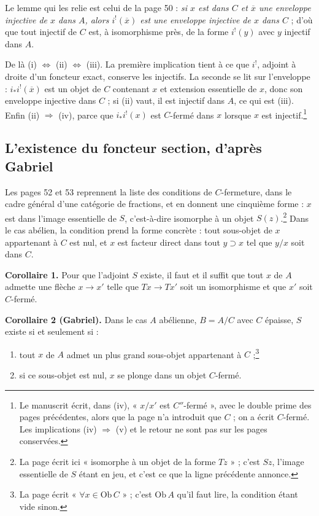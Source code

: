 \documentclass[11pt,a4paper]{article}
\begin{document}
Le lemme qui les relie est celui de la page 50 : \emph{si $x$ est dans $C$ et
$\overline{x}$ une enveloppe injective de $x$ dans $A$, alors
$i^{!}(\overline{x})$ est une enveloppe injective de $x$ dans $C$} ; d'où
que tout injectif de $C$ est, à isomorphisme près, de la forme $i^{!}(y)$ avec
$y$ injectif dans $A$.

De là (i) $\Leftrightarrow$ (ii) $\Leftrightarrow$ (iii). La première
implication tient à ce que $i^{!}$, adjoint à droite d'un foncteur exact,
conserve les injectifs. La seconde se lit sur l'enveloppe : $i_{*}i^{!}
(\overline{x})$ est un objet de $C$ contenant $x$ et extension essentielle de
$x$, donc son enveloppe injective dans $C$ ; si (ii) vaut, il est injectif dans
$A$, ce qui est (iii). Enfin (ii) $\Rightarrow$ (iv), parce que
$i_{*}i^{!}(x)$ est $C$-fermé dans $x$ lorsque $x$ est
injectif.\footnote{Le manuscrit écrit, dans (iv), « $x/x'$ est $C''$-fermé »,
avec le double prime des pages précédentes, alors que la page n'a introduit que
$C$ ; on a écrit $C$-fermé. Les implications (iv) $\Rightarrow$ (v) et le
retour ne sont pas sur les pages conservées.}

\subsection*{L'existence du foncteur section, d'après Gabriel}

Les pages 52 et 53 reprennent la liste des conditions de $C$-fermeture, dans le
cadre général d'une catégorie de fractions, et en donnent une cinquième forme :
$x$ est dans l'image essentielle de $S$, c'est-à-dire isomorphe à un objet
$S(z)$.\footnote{La page écrit ici « isomorphe à un objet de la forme $Tz$ » ;
c'est $Sz$, l'image essentielle de $S$ étant en jeu, et c'est ce que la ligne
précédente annonce.} Dans le cas abélien, la condition prend la forme
concrète : tout sous-objet de $x$ appartenant à $C$ est nul, et $x$ est facteur
direct dans tout $y \supset x$ tel que $y/x$ soit dans $C$.

\textbf{Corollaire 1.} Pour que l'adjoint $S$ existe, il faut et il suffit que
tout $x$ de $A$ admette une flèche $x \to x'$ telle que $Tx \to Tx'$ soit un
isomorphisme et que $x'$ soit $C$-fermé.

\textbf{Corollaire 2 (Gabriel).} Dans le cas $A$ abélienne, $B = A/C$ avec $C$
épaisse, $S$ existe si et seulement si :

\begin{enumerate}
\item[a)] tout $x$ de $A$ admet un plus grand sous-objet appartenant à
$C$ ;\footnote{La page écrit « $\forall x \in \mathrm{Ob}\,C$ » ; c'est
$\mathrm{Ob}\,A$ qu'il faut lire, la condition étant vide sinon.}
\item[b)] si ce sous-objet est nul, $x$ se plonge dans un objet $C$-fermé.
\end{enumerate}
\end{document}
